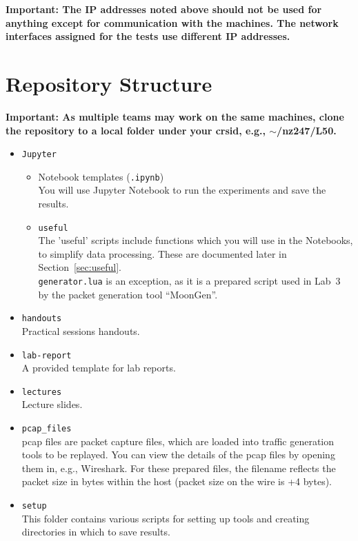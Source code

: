 \documentclass[]{scrartcl}
\begin{document}
\noindent\textbf{Important: The IP addresses noted above should not be used for anything except for communication with the machines. The network interfaces assigned for the tests use different IP addresses.}

\newpage

\section{Repository Structure}
\textbf{Important: As multiple teams may work on the same machines, clone the repository to a local folder under your crsid, e.g., $\sim$/nz247/L50.}
\begin{itemize}
	\item \texttt{Jupyter} \\
		\begin{itemize}
			\item Notebook templates (\texttt{.ipynb}) \\
				You will use Jupyter Notebook to run the experiments and save the results. 
			\item \texttt{useful} \\
				The 'useful' scripts include functions which you will use in the Notebooks, to simplify data processing. These are documented later in Section~\ref{sec:useful}.\\ \texttt{generator.lua} is an exception, as it is a prepared script used in Lab~3 by the packet generation tool ``MoonGen''.
		\end{itemize}
	\item\texttt{handouts} \\
	Practical sessions handouts. 
	\item \texttt{lab-report} \\
    A provided template for lab reports. 
    \item \texttt{lectures} \\
    Lecture slides. 
	\item \texttt{pcap{\_}files} \\
	pcap files are packet capture files, which are loaded into traffic generation tools to be replayed. You can view the details of the pcap files by opening them in, e.g., Wireshark. For these prepared files, the filename reflects the packet size in bytes within the host (packet size on the wire is +4 bytes).
	\item \texttt{setup} \\
	This folder contains various scripts for setting up tools and creating directories in which to save results.
\end{itemize}
\end{document}
